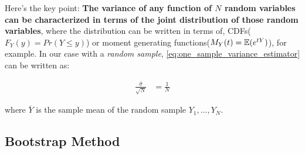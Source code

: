 Here's the key point: \textbf{The variance of any function of $N$ random variables can be characterized in terms of the joint distribution of those random variables}, where the
distribution can be written in terms of, CDFs($F_Y(y) = Pr(Y \leq y)$) or moment generating functions($M_Y(t) = {\mathbb{E}}(e^{tY})$), for example.
In our case with a \textit{random sample}, \ref{eq:one_sample_variance_estimator} can be written as:

\begin{align}
    \frac{\hat{\sigma}}{\sqrt{N}} &= \frac{1}{N} \label{eq:one_sample_variance_estimator_2}
\end{align}

where $\overline{Y}$ is the sample mean of the random sample $Y_1, \ldots, Y_N$.


\subsection{Bootstrap Method}
